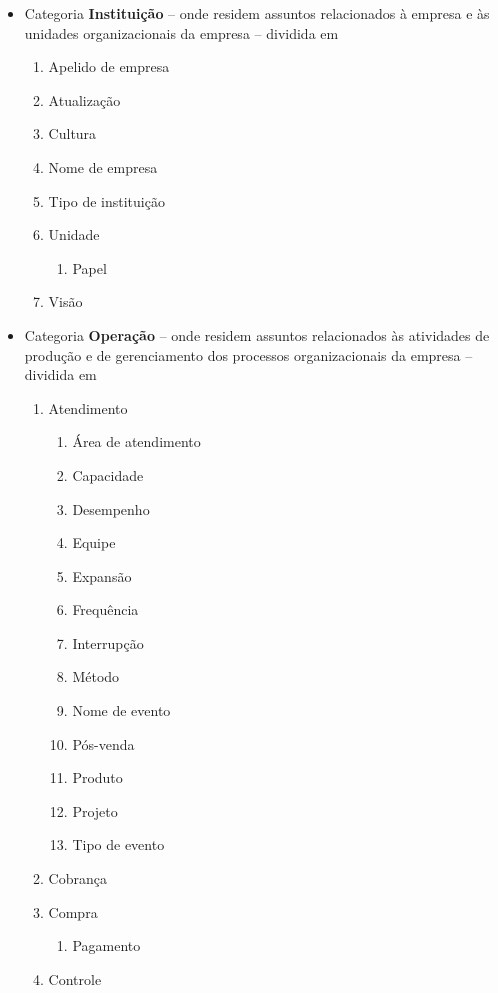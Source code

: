 \begin{multicols}{2}
\begin{itemize}
\begin{enumerate}
\end{enumerate}	\item Categoria \textbf{Instituição} -- onde residem assuntos relacionados à empresa e às unidades organizacionais da empresa -- dividida em	\begin{enumerate} 	\item Apelido de empresa				
			\item Atualização				
			\item Cultura				
			\item Nome de empresa				
			\item Tipo de instituição				
			\item Unidade	\begin{enumerate}			
					\item Papel	\end{enumerate}	
			\item Visão				
\end{enumerate}	\item Categoria \textbf{Operação} -- onde residem assuntos relacionados às atividades de produção e de gerenciamento dos processos organizacionais da empresa -- dividida em 	\begin{enumerate} 	\item Atendimento	\begin{enumerate}			
					\item Área de atendimento		
					\item Capacidade		
					\item Desempenho		
					\item Equipe		
					\item Expansão		
					\item Frequência		
					\item Interrupção		
					\item Método		
					\item Nome de evento		
					\item Pós-venda		
					\item Produto		
					\item Projeto		
					\item Tipo de evento	\end{enumerate}	
			\item Cobrança				
			\item Compra	\begin{enumerate}			
					\item Pagamento	\end{enumerate}	
			\item Controle	\begin{enumerate}			

\end{enumerate}
\end{enumerate}
\end{itemize}
\end{multicols}
